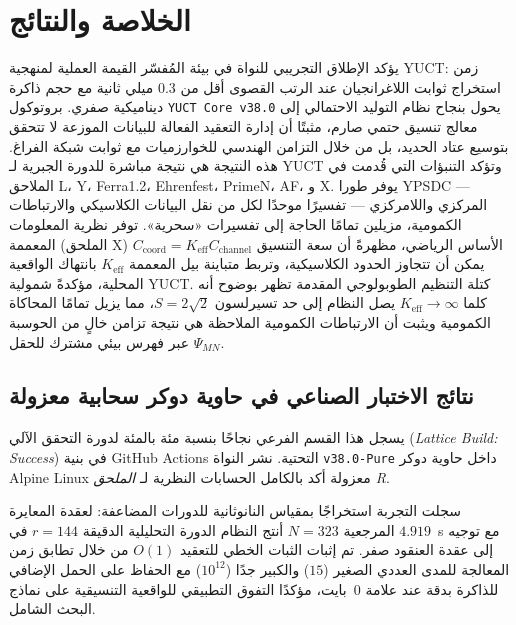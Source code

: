 \documentclass[12pt,a4paper]{article}
\begin{document}
	\section{الخلاصة والنتائج}
	يؤكد الإطلاق التجريبي للنواة في بيئة المُفسّر القيمة العملية لمنهجية YUCT: زمن استخراج ثوابت اللاغرانجيان عند الرتب القصوى أقل من 0.3 ميلي ثانية مع حجم ذاكرة ديناميكية صفري. بروتوكول \texttt{YUCT Core v38.0} يحول بنجاح نظام التوليد الاحتمالي إلى معالج تنسيق حتمي صارم، مثبتًا أن إدارة التعقيد الفعالة للبيانات الموزعة لا تتحقق بتوسيع عتاد الحديد، بل من خلال التزامن الهندسي للخوارزميات مع ثوابت شبكة الفراغ. هذه النتيجة هي نتيجة مباشرة للدورة الجبرية لـ YUCT وتؤكد التنبؤات التي قُدمت في الملاحق L، Y، Ferra1.2، Ehrenfest، PrimeN، AF، و X. يوفر طورا YPSDC — المركزي واللامركزي — تفسيرًا موحدًا لكل من نقل البيانات الكلاسيكي والارتباطات الكمومية، مزيلين تمامًا الحاجة إلى تفسيرات «سحرية». توفر نظرية المعلومات المعممة (الملحق X) الأساس الرياضي، مظهرةً أن سعة التنسيق \(C_{\text{coord}} = K_{\mathrm{eff}} C_{\text{channel}}\) يمكن أن تتجاوز الحدود الكلاسيكية، وتربط متباينة بيل المعممة \(K_{\mathrm{eff}}\) بانتهاك الواقعية المحلية، مؤكدةً شمولية YUCT. كتلة التنظيم الطوبولوجي المقدمة تظهر بوضوح أنه كلما \(K_{\mathrm{eff}} \to \infty\) يصل النظام إلى حد تسيرلسون \(S = 2\sqrt{2}\)، مما يزيل تمامًا المحاكاة الكمومية ويثبت أن الارتباطات الكمومية الملاحظة هي نتيجة تزامن خالٍ من الحوسبة عبر فهرس بيئي مشترك للحقل \(\Psi_{MN}\).
	
	\subsection{نتائج الاختبار الصناعي في حاوية دوكر سحابية معزولة}
	يسجل هذا القسم الفرعي نجاحًا بنسبة مئة بالمئة لدورة التحقق الآلي (\textit{Lattice Build: Success}) في بنية GitHub Actions التحتية. نشر النواة \texttt{v38.0-Pure} داخل حاوية دوكر Alpine Linux معزولة أكد بالكامل الحسابات النظرية لـ \textit{الملحق R}.
	
	سجلت التجربة استخراجًا بمقياس النانوثانية للدورات المضاعفة: لعقدة المعايرة المرجعية \(N=323\) أنتج النظام الدورة التحليلية الدقيقة \(r=144\) في \(4.919\)~\mu s مع توجيه إلى عقدة العنقود صفر. تم إثبات الثبات الخطي للتعقيد \(O(1)\) من خلال تطابق زمن المعالجة للمدى العددي الصغير (\(15\)) والكبير جدًا (\(10^{12}\)) مع الحفاظ على الحمل الإضافي للذاكرة بدقة عند علامة \(0\)~بايت، مؤكدًا التفوق التطبيقي للواقعية التنسيقية على نماذج البحث الشامل.
	
\end{document}
